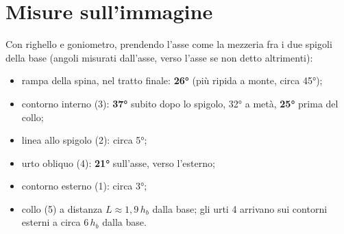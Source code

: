 \documentclass[11pt,a4paper]{article}
\begin{document}
\section{Misure sull'immagine}
Con righello e goniometro, prendendo l'asse come la mezzeria fra i due spigoli della base (angoli misurati dall'asse,
verso l'asse se non detto altrimenti):
\begin{itemize}
\item rampa della spina, nel tratto finale: \textbf{\ang{26}} (più ripida a monte, circa \ang{45});
\item contorno interno (3): \textbf{\ang{37}} subito dopo lo spigolo, \ang{32} a metà, \textbf{\ang{25}} prima del
  collo;
\item linea allo spigolo (2): circa \ang{5};
\item urto obliquo (4): \textbf{\ang{21}} sull'asse, verso l'esterno;
\item contorno esterno (1): circa \ang{3};
\item collo (5) a distanza $L\approx1{,}9\,h_b$ dalla base; gli urti 4 arrivano sui contorni esterni a circa
  $6\,h_b$ dalla base.
\end{itemize}

\end{document}
